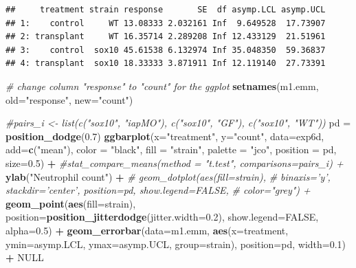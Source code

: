 \documentclass[]{book}
\newenvironment{Shaded}{\begin{snugshade}}{\end{snugshade}}
\newcommand{\KeywordTok}[1]{\textcolor[rgb]{0.13,0.29,0.53}{\textbf{#1}}}
\newcommand{\DataTypeTok}[1]{\textcolor[rgb]{0.13,0.29,0.53}{#1}}
\newcommand{\FloatTok}[1]{\textcolor[rgb]{0.00,0.00,0.81}{#1}}
\newcommand{\StringTok}[1]{\textcolor[rgb]{0.31,0.60,0.02}{#1}}
\newcommand{\CommentTok}[1]{\textcolor[rgb]{0.56,0.35,0.01}{\textit{#1}}}
\newcommand{\OtherTok}[1]{\textcolor[rgb]{0.56,0.35,0.01}{#1}}
\newcommand{\OperatorTok}[1]{\textcolor[rgb]{0.81,0.36,0.00}{\textbf{#1}}}
\newcommand{\NormalTok}[1]{#1}
\begin{document}
\begin{verbatim}
##     treatment strain response       SE  df asymp.LCL asymp.UCL
## 1:    control     WT 13.08333 2.032161 Inf  9.649528  17.73907
## 2: transplant     WT 16.35714 2.289208 Inf 12.433129  21.51961
## 3:    control  sox10 45.61538 6.132974 Inf 35.048350  59.36837
## 4: transplant  sox10 18.33333 3.871911 Inf 12.119140  27.73391
\end{verbatim}

\begin{Shaded}
\begin{Highlighting}[]
\CommentTok{# change column "response" to "count" for the ggplot}
\KeywordTok{setnames}\NormalTok{(m1.emm, }\DataTypeTok{old=}\StringTok{"response"}\NormalTok{, }\DataTypeTok{new=}\StringTok{"count"}\NormalTok{)}
\end{Highlighting}
\end{Shaded}

\begin{Shaded}
\begin{Highlighting}[]
\CommentTok{#pairs_i <- list(c("sox10", "iapMO"), c("sox10", "GF"), c("sox10", "WT"))}
\NormalTok{pd =}\StringTok{ }\KeywordTok{position_dodge}\NormalTok{(}\FloatTok{0.7}\NormalTok{)}
\KeywordTok{ggbarplot}\NormalTok{(}\DataTypeTok{x=}\StringTok{"treatment"}\NormalTok{, }
          \DataTypeTok{y=}\StringTok{"count"}\NormalTok{,}
          \DataTypeTok{data=}\NormalTok{exp6d,}
          \DataTypeTok{add=}\KeywordTok{c}\NormalTok{(}\StringTok{"mean"}\NormalTok{),}
          \DataTypeTok{color =} \StringTok{"black"}\NormalTok{,}
          \DataTypeTok{fill =} \StringTok{"strain"}\NormalTok{,}
          \DataTypeTok{palette =} \StringTok{"jco"}\NormalTok{,}
          \DataTypeTok{position =}\NormalTok{ pd,}
          \DataTypeTok{size=}\FloatTok{0.5}\NormalTok{) }\OperatorTok{+}
\StringTok{  }\CommentTok{#stat_compare_means(method = "t.test", comparisons=pairs_i) +}
\StringTok{  }\KeywordTok{ylab}\NormalTok{(}\StringTok{"Neutrophil count"}\NormalTok{) }\OperatorTok{+}
\StringTok{  }\CommentTok{# geom_dotplot(aes(fill=strain),}
\StringTok{  }\CommentTok{#              binaxis='y', stackdir='center', position=pd, show.legend=FALSE,}
\StringTok{  }\CommentTok{#              color="grey") +}
\StringTok{  }\KeywordTok{geom_point}\NormalTok{(}\KeywordTok{aes}\NormalTok{(}\DataTypeTok{fill=}\NormalTok{strain), }\DataTypeTok{position=}\KeywordTok{position_jitterdodge}\NormalTok{(}\DataTypeTok{jitter.width=}\FloatTok{0.2}\NormalTok{), }\DataTypeTok{show.legend=}\OtherTok{FALSE}\NormalTok{, }\DataTypeTok{alpha=}\FloatTok{0.5}\NormalTok{) }\OperatorTok{+}
\StringTok{  }\KeywordTok{geom_errorbar}\NormalTok{(}\DataTypeTok{data=}\NormalTok{m1.emm, }\KeywordTok{aes}\NormalTok{(}\DataTypeTok{x=}\NormalTok{treatment, }\DataTypeTok{ymin=}\NormalTok{asymp.LCL, }\DataTypeTok{ymax=}\NormalTok{asymp.UCL, }\DataTypeTok{group=}\NormalTok{strain),}
                \DataTypeTok{position=}\NormalTok{pd, }\DataTypeTok{width=}\FloatTok{0.1}\NormalTok{) }\OperatorTok{+}
\StringTok{  }\OtherTok{NULL}
\end{Highlighting}
\end{Shaded}
\end{document}
